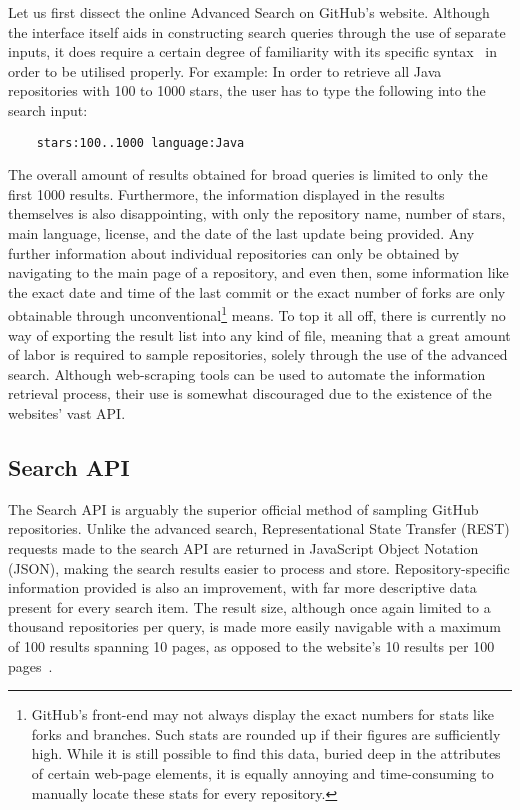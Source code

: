 Let us first dissect the online Advanced Search on GitHub's website.
Although the interface itself aids in constructing search queries through the use of separate inputs, it does require a certain degree of familiarity with its specific syntax~\cite{HELPSEARCH} in order to be utilised properly.
For example: In order to retrieve all Java repositories with 100 to 1000 stars, the user has to type the following into the search input:
\begin{verbatim}
    stars:100..1000 language:Java
\end{verbatim}
The overall amount of results obtained for broad queries is limited to only the first 1000 results.
Furthermore, the information displayed in the results themselves is also disappointing, with only the repository name, number of stars, main language, license, and the date of the last update being provided.
Any further information about individual repositories can only be obtained by navigating to the main page of a repository, and even then, some information like the exact date and time of the last commit or the exact number of forks are only obtainable through unconventional\footnote{GitHub's front-end may not always display the exact numbers for stats like forks and branches.
Such stats are rounded up if their figures are sufficiently high.
While it is still possible to find this data, buried deep in the attributes of certain web-page elements, it is equally annoying and time-consuming to manually locate these stats for every repository.} means.
To top it all off, there is currently no way of exporting the result list into any kind of file, meaning that a great amount of labor is required to sample repositories, solely through the use of the advanced search.
Although web-scraping tools can be used to automate the information retrieval process, their use is somewhat discouraged due to the existence of the websites' vast API\@.

\subsection{Search API}

The Search API is arguably the superior official method of sampling GitHub repositories.
Unlike the advanced search, Representational State Transfer (REST) requests made to the search API are returned in JavaScript Object Notation (JSON), making the search results easier to process and store.
Repository-specific information provided is also an improvement, with far more descriptive data present for every search item.
The result size, although once again limited to a thousand repositories per query, is made more easily navigable with a maximum of 100 results spanning 10 pages, as opposed to the website's 10 results per 100 pages~\cite{APISEARCH}.

